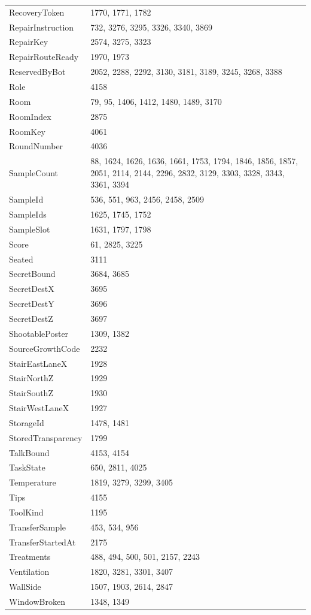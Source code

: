 \begin{longtable}{p{}p{}}
RecoveryToken & 1770, 1771, 1782 \\
RepairInstruction & 732, 3276, 3295, 3326, 3340, 3869 \\
RepairKey & 2574, 3275, 3323 \\
RepairRouteReady & 1970, 1973 \\
ReservedByBot & 2052, 2288, 2292, 3130, 3181, 3189, 3245, 3268, 3388 \\
Role & 4158 \\
Room & 79, 95, 1406, 1412, 1480, 1489, 3170 \\
RoomIndex & 2875 \\
RoomKey & 4061 \\
RoundNumber & 4036 \\
SampleCount & 88, 1624, 1626, 1636, 1661, 1753, 1794, 1846, 1856, 1857, 2051, 2114, 2144, 2296, 2832, 3129, 3303, 3328, 3343, 3361, 3394 \\
SampleId & 536, 551, 963, 2456, 2458, 2509 \\
SampleIds & 1625, 1745, 1752 \\
SampleSlot & 1631, 1797, 1798 \\
Score & 61, 2825, 3225 \\
Seated & 3111 \\
SecretBound & 3684, 3685 \\
SecretDestX & 3695 \\
SecretDestY & 3696 \\
SecretDestZ & 3697 \\
ShootablePoster & 1309, 1382 \\
SourceGrowthCode & 2232 \\
StairEastLaneX & 1928 \\
StairNorthZ & 1929 \\
StairSouthZ & 1930 \\
StairWestLaneX & 1927 \\
StorageId & 1478, 1481 \\
StoredTransparency & 1799 \\
TalkBound & 4153, 4154 \\
TaskState & 650, 2811, 4025 \\
Temperature & 1819, 3279, 3299, 3405 \\
Tips & 4155 \\
ToolKind & 1195 \\
TransferSample & 453, 534, 956 \\
TransferStartedAt & 2175 \\
Treatments & 488, 494, 500, 501, 2157, 2243 \\
Ventilation & 1820, 3281, 3301, 3407 \\
WallSide & 1507, 1903, 2614, 2847 \\
WindowBroken & 1348, 1349 \\
\bottomrule
\end{longtable}
